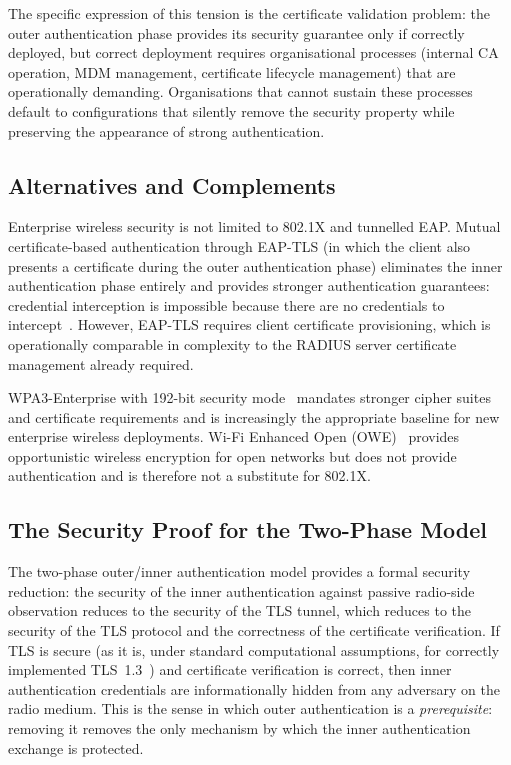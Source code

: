 \documentclass[journal]{IEEEtran}
\begin{document}
The specific expression of this tension is the certificate validation problem:
the outer authentication phase provides its security guarantee only if correctly
deployed, but correct deployment requires organisational processes (internal CA
operation, MDM management, certificate lifecycle management) that are operationally
demanding. Organisations that cannot sustain these processes default to
configurations that silently remove the security property while preserving the
appearance of strong authentication.

\subsection{Alternatives and Complements}

Enterprise wireless security is not limited to 802.1X and tunnelled EAP. Mutual
certificate-based authentication through EAP-TLS (in which the client also presents
a certificate during the outer authentication phase) eliminates the inner
authentication phase entirely and provides stronger authentication guarantees:
credential interception is impossible because there are no credentials to
intercept~\cite{rfc5216}. However, EAP-TLS requires client certificate provisioning,
which is operationally comparable in complexity to the RADIUS server certificate
management already required.

WPA3-Enterprise with 192-bit security mode~\cite{wpa3} mandates stronger cipher
suites and certificate requirements and is increasingly the appropriate baseline
for new enterprise wireless deployments. Wi-Fi Enhanced Open (OWE)~\cite{rfc8110}
provides opportunistic wireless encryption for open networks but does not provide
authentication and is therefore not a substitute for 802.1X.

\subsection{The Security Proof for the Two-Phase Model}

The two-phase outer/inner authentication model provides a formal security
reduction: the security of the inner authentication against passive radio-side
observation reduces to the security of the TLS tunnel, which reduces to the
security of the TLS protocol and the correctness of the certificate verification.
If TLS is secure (as it is, under standard computational assumptions, for
correctly implemented TLS~1.3~\cite{rfc8446}) and certificate verification is
correct, then inner authentication credentials are informationally hidden from
any adversary on the radio medium. This is the sense in which outer authentication
is a \emph{prerequisite}: removing it removes the only mechanism by which the
inner authentication exchange is protected.
\end{document}
